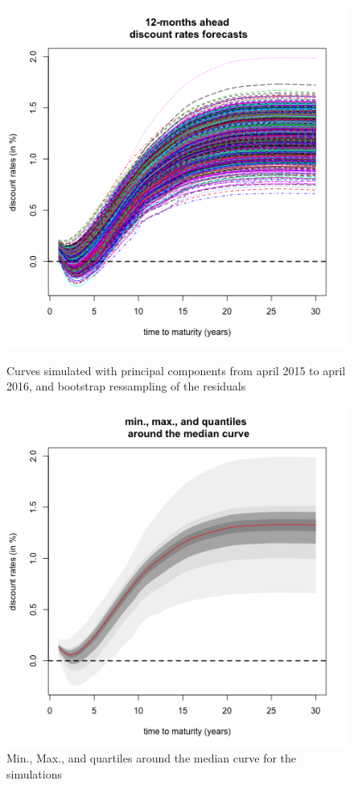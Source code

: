 \begin{figure}[!htb]
    \centering
    \begin{minipage}{.5\textwidth}
        \centering
        \includegraphics[width=0.8\linewidth, height=0.3\textheight]{gfx/chapter-yc-insurance/forecasting_graph3}
        \caption{Curves simulated with principal components from april 2015 to april 2016, and bootstrap ressampling of the residuals}
        \label{forecast:4}
    \end{minipage}%
    \begin{minipage}{0.5\textwidth}
        \centering
        \includegraphics[width=0.8\linewidth, height=0.3\textheight]{gfx/chapter-yc-insurance/forecasting_graph4}
        \caption{Min., Max., and quartiles around the median curve for the simulations}
        \label{forecast:5}
    \end{minipage}
  \end{figure}

